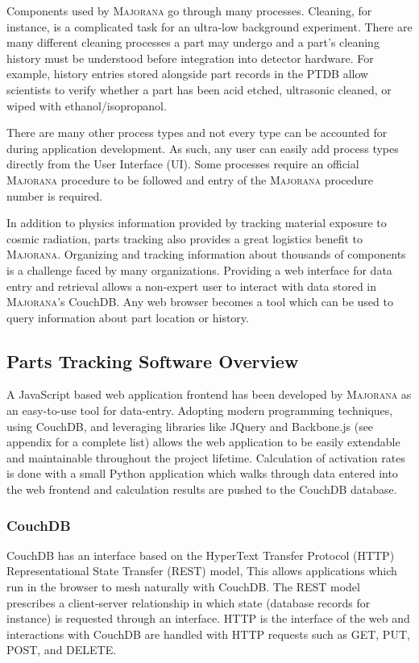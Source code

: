 \documentclass[journal]{IEEEtran}
\begin{document}
Components used by \textsc{Majorana} go through many processes. Cleaning, for instance, is a complicated task for an ultra-low
background experiment. There are many different cleaning processes a part may undergo and a part's cleaning history
must be understood before integration into detector hardware. For example, history entries stored alongside part records in the PTDB
allow scientists to verify whether a part has been acid etched, ultrasonic cleaned, or wiped with ethanol/isopropanol.

There are many other process types and not every type can
be accounted for during application development. As such, any user can 
easily add process types directly from the User Interface (UI). Some processes require an official \textsc{Majorana} procedure to be
followed and entry of the \textsc{Majorana} procedure number is required.

In addition to physics information provided by tracking material exposure to cosmic radiation, parts tracking also provides
a great logistics benefit to \textsc{Majorana}. Organizing and tracking information about thousands of components is a
challenge faced by many organizations. Providing a web interface for data entry and retrieval allows
a non-expert user to interact with data stored in \textsc{Majorana}'s CouchDB. Any web browser becomes a tool which can
be used to query information about part location or history.

\subsection{Parts Tracking Software Overview}
A JavaScript based web application frontend has been developed by \textsc{Majorana} as an easy-to-use tool for data-entry.
Adopting modern programming techniques, using CouchDB, and leveraging libraries like JQuery and Backbone.js (see appendix for a complete list) allows the
web application to be easily extendable and maintainable throughout the project lifetime. Calculation of
activation rates is done with a small Python application which walks through data entered into the web
frontend and calculation results are pushed to the CouchDB database.

\subsubsection{CouchDB}
CouchDB has an interface based on the HyperText Transfer Protocol (HTTP) Representational State Transfer (REST) model,
This allows applications which run in the browser to mesh naturally with CouchDB.
The REST model prescribes a client-server
relationship in which state (database records for instance) is requested through an interface.
HTTP is the interface of the web and interactions with CouchDB are handled with HTTP
requests such as GET, PUT, POST, and DELETE. 
\end{document}
